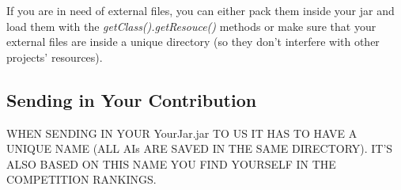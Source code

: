 \documentclass[10pt,a4paper]{article}
\begin{document}
If you are in need of external files, you can either pack them inside your jar and load them with the \textit{getClass().getResouce()} methods or make sure that your external files are inside a unique directory (so they don't interfere with other projects' resources).


\subsection{Sending in Your Contribution}


WHEN SENDING IN YOUR YourJar.jar TO US IT HAS TO HAVE A UNIQUE NAME (ALL AIs ARE SAVED IN THE SAME DIRECTORY). IT'S ALSO BASED ON THIS NAME YOU FIND YOURSELF IN THE COMPETITION RANKINGS.

\end{document}

